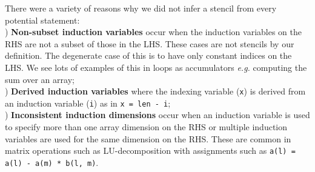\documentclass[10pt,preprint,numbers]{sigplanconf}
\theoremstyle{definition}
\newcommand{\eg}{\emph{e.g.}}
\begin{document}
There were a variety of reasons why we did not infer a
stencil from every potential statement: \\
) \textbf{Non-subset induction variables} occur when the
induction variables on the RHS are not a subset of those in the LHS. These
cases are not stencils by our definition. The degenerate case of this
is to have only constant indices on the LHS. We see lots of examples
of this in loops as accumulators \eg{} computing the sum over an array; \\
) \textbf{Derived induction variables} where the
indexing variable (\texttt{x}) is derived from an
induction variable (\texttt{i}) as in
\texttt{x = len - i};  \\
) \textbf{Inconsistent induction dimensions} occur when
an induction variable is used to specify more than one array dimension
on the RHS or multiple induction variables are used for the same
dimension on the RHS. These are common in matrix operations such as
LU-decomposition with assignments such as
\texttt{a(l) = a(l) - a(m) * b(l, m)}.






\end{document}
